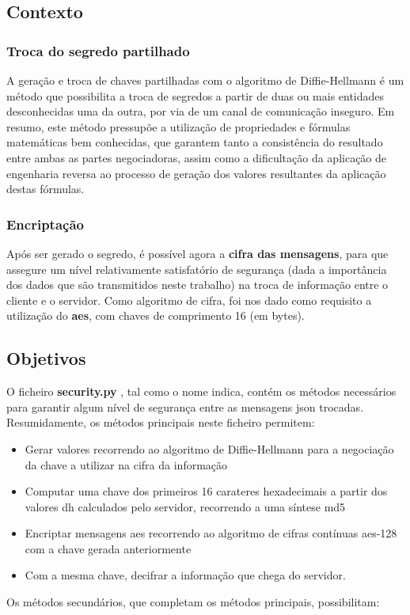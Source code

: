 \documentclass{report}
\begin{document}
\subsection{Contexto}


\subsubsection{Troca do segredo partilhado}
A geração e troca de chaves partilhadas com o algoritmo de Diffie-Hellmann é um método que possibilita a troca de segredos a partir de duas ou mais entidades desconhecidas uma da outra, por via de um canal de comunicação inseguro.\newline
Em resumo, este método pressupõe a utilização de propriedades e fórmulas matemáticas bem conhecidas, que garantem tanto a consistência do resultado entre ambas as partes negociadoras, assim como a dificultação da aplicação de engenharia reversa ao processo de geração dos valores resultantes da aplicação destas fórmulas.

\subsubsection{Encriptação}
Após ser gerado o segredo, é possível agora a \textbf{cifra das mensagens}, para que assegure um nível relativamente satisfatório de segurança (dada a importância dos dados que são transmitidos neste trabalho) na troca de informação entre o cliente e o servidor. Como algoritmo de cifra, foi nos dado como requisito a utilização do \textbf{\ac{aes}}, com chaves de comprimento 16 (em bytes).


\subsection{Objetivos}
O ficheiro \textbf{security.py} , tal como o nome indica, contém os métodos necessários para garantir algum nível de segurança entre as mensagens \ac{json} trocadas. Resumidamente, os métodos principais neste ficheiro permitem:

\begin{itemize}
\item Gerar valores recorrendo ao algoritmo de Diffie-Hellmann para a negociação da chave a utilizar na cifra da informação
\item Computar uma chave dos primeiros 16 carateres hexadecimais a partir dos valores \ac{dh} calculados pelo servidor, recorrendo a uma síntese \ac{md5}
\item Encriptar mensagens \ac{aes} recorrendo ao algoritmo de cifras contínuas \ac{aes}-128 com a chave gerada anteriormente
\item Com a mesma chave, decifrar a informação que chega do servidor.
\end{itemize}
Os métodos secundários, que completam os métodos principais, possibilitam:
\end{document}

